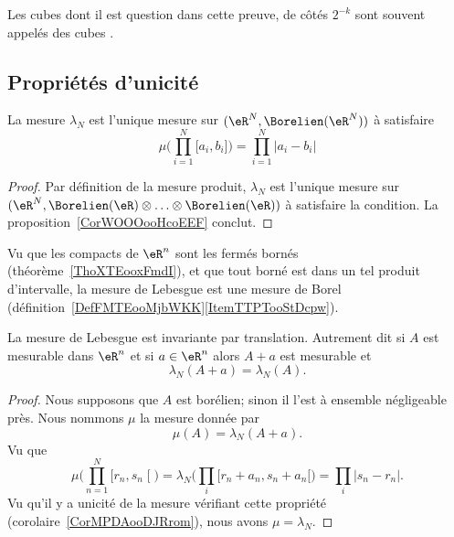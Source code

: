 Les cubes dont il est question dans cette preuve, de côtés \( 2^{-k}\) sont souvent appelés des cubes .

\subsection{Propriétés d'unicité}

\begin{corollary}       \label{CorMPDAooDJRrom}
	La mesure \( \lambda_N\) est l'unique mesure sur \(   (\eR^N,  \Borelien(\eR^N) )   \) à satisfaire
	\begin{equation}
		\mu\big( \prod_{i=1}^N\mathopen[ a_i , b_i \mathclose] \big)=\prod_{i=1}^N| a_i-b_i |
	\end{equation}
\end{corollary}

\begin{proof}
	Par définition de la mesure produit, \( \lambda_N\) est l'unique mesure sur \(   (\eR^N,  \Borelien(\eR)\otimes\ldots\otimes\Borelien(\eR) )   \) à satisfaire la condition. La proposition~\ref{CorWOOOooHcoEEF} conclut.
\end{proof}

Vu que les compacts de \( \eR^n\) sont les fermés bornés (théorème~\ref{ThoXTEooxFmdI}), et que tout borné est dans un tel produit d'intervalle, la mesure de Lebesgue est une mesure de Borel (définition~\ref{DefFMTEooMjbWKK}\ref{ItemTTPTooStDcpw}).

\begin{theorem}        \label{THOooTMWHooThsDHj}
	La mesure de Lebesgue est invariante par translation. Autrement dit si \( A\) est mesurable dans \( \eR^n\) et si \( a\in \eR^n\) alors \( A+a\) est mesurable et
	\begin{equation}
		\lambda_N(A+a)=\lambda_N(A).
	\end{equation}
\end{theorem}

\begin{proof}
	Nous supposons que \( A\) est borélien; sinon il l'est à ensemble négligeable près. Nous nommons \( \mu\) la mesure donnée par
	\begin{equation}
		\mu(A)=\lambda_N(A+a).
	\end{equation}
	Vu que
	\begin{equation}
		\mu\big( \prod_{n=1}^N\mathopen[ r_n , s_n \mathclose[ \big)=\lambda_N\big( \prod_i\mathopen[ r_n+a_n , s_n+a_n [ \big)=\prod_i| s_n-r_n |.
	\end{equation}
	Vu qu'il y a unicité de la mesure vérifiant cette propriété (corolaire~\ref{CorMPDAooDJRrom}), nous avons \( \mu=\lambda_N\).
\end{proof}

